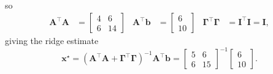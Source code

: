 \documentclass[letter, 12pt]{article}
\begin{document}
\begin{enumerate}
\begin{enumerate}
\begin{align*}
            \end{align*}
            so
            \begin{align*}
            \mathbf{A}^\top\mathbf{A} &= \begin{bmatrix}4&6\\6&14\end{bmatrix} & \mathbf{A}^\top\mathbf{b} &= \begin{bmatrix}6\\10\end{bmatrix} & \mathbf{\Gamma}^\top\mathbf{\Gamma} &= \mathbf{I}^\top\mathbf{I} = \mathbf{I},
            \end{align*}
            giving the ridge estimate
            \[
            \mathbf{x}^\star = (\mathbf{A}^\top\mathbf{A}+\mathbf{\Gamma}^\top\mathbf{\Gamma})^{-1} \mathbf{A}^\top\mathbf{b} = \begin{bmatrix}5&6\\6&15\end{bmatrix}^{-1}\begin{bmatrix}6\\10\end{bmatrix}.
            \]
            \vfill
    \end{enumerate}
    \clearpage


\end{enumerate}
\end{document}
